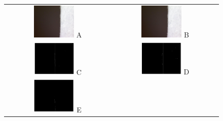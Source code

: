 \begin{figure}[H]
	\centering

	\begin{tabular}{cc}
		\includegraphics[width=0.4\textwidth]{figures/dilatometer_test.jpg} A &
		\includegraphics[width=0.4\textwidth]{figures/dilatometer_test.jpg} B  \\
		\includegraphics[width=0.4\textwidth]{figures/dila_blur7thresh36.png} C &
		\includegraphics[width=0.4\textwidth]{figures/dila_blur5thresh30.png} D \\
		\includegraphics[width=0.4\textwidth]{figures/dila_blur9thresh35.png} E &

\end{tabular}
\end{figure}
